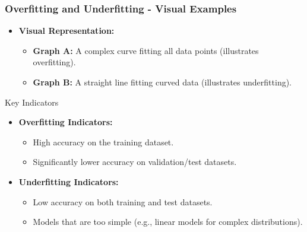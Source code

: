 \documentclass[aspectratio=169]{beamer}
\begin{document}
\begin{frame}[fragile]
    \frametitle{Overfitting and Underfitting - Visual Examples}
    \begin{itemize}
        \item \textbf{Visual Representation:}
        \begin{itemize}
            \item \textbf{Graph A:} A complex curve fitting all data points (illustrates overfitting).
            \item \textbf{Graph B:} A straight line fitting curved data (illustrates underfitting).
        \end{itemize}
    \end{itemize}

    \begin{block}{Key Indicators}
        \begin{itemize}
            \item \textbf{Overfitting Indicators:}
            \begin{itemize}
                \item High accuracy on the training dataset.
                \item Significantly lower accuracy on validation/test datasets.
            \end{itemize}
            \item \textbf{Underfitting Indicators:}
            \begin{itemize}
                \item Low accuracy on both training and test datasets.
                \item Models that are too simple (e.g., linear models for complex distributions).
            \end{itemize}
        \end{itemize}
    \end{block}
\end{frame}
\end{document}
